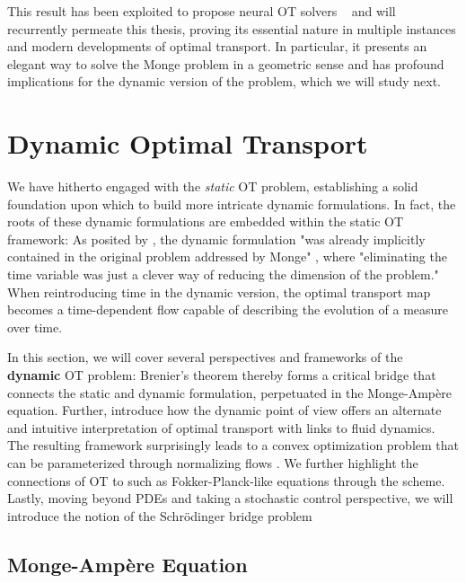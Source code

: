 This result has been exploited to propose neural OT solvers ~\citep{makkuva2020optimal, korotin2021wasserstein, bunne2022proximal, alvarez2021optimizing, mokrov2021large} and  will recurrently permeate this thesis, proving its essential nature in multiple instances and modern developments of optimal transport.
In particular, it presents an elegant way to solve the Monge problem in a geometric sense and has profound implications for the dynamic version of the problem, which we will study next.


\section{Dynamic Optimal Transport} \label{sec:background_ot_dynamic}

We have hitherto engaged with the \emph{static} \acrlong{OT} problem, establishing a solid foundation upon which to build more intricate dynamic formulations. In fact, the roots of these dynamic formulations are embedded within the static \acrshort{OT} framework: As posited by \citet{benamou2000computational}, the dynamic formulation "was already implicitly contained in the original problem addressed by Monge" \citep{monge1781histoire}, where "eliminating the time variable was just a clever way of reducing the dimension of the problem." When reintroducing time in the dynamic version, the optimal transport map becomes a time-dependent flow capable of describing the evolution of a measure over time.

In this section, we will cover several perspectives and frameworks of the \textbf{dynamic} \acrshort{OT} problem: Brenier's theorem thereby forms a critical bridge that connects the static and dynamic formulation, perpetuated in the Monge-Amp{\`e}re equation.
Further, \citet*{benamou2000computational} introduce how the dynamic point of view offers an alternate and intuitive interpretation of optimal transport with links to fluid dynamics. The resulting framework surprisingly leads to a convex optimization problem that can be parameterized through normalizing flows \citep{tong2020trajectorynet}.
We further highlight the connections of \acrshort{OT} to  such as Fokker-Planck-like equations through the \citeauthor*{jordan1998variational} scheme.
Lastly, moving beyond PDEs and taking a stochastic control perspective, we will introduce the notion of the Schr\"odinger bridge problem


\subsection{Monge-Amp{\`e}re Equation} \label{sec:background_monge_ampere}

